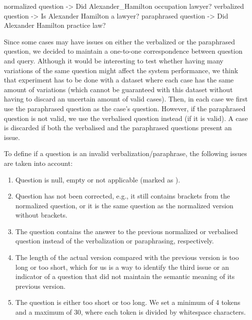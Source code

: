 \begin{sparqlcode}[%
    caption={Example of questions contained in one case of the \LCQuADtwo{} dataset.}, 
    label={lst:questionExampleLcquad2}]
normalized question  -> Did {Alexander_Hamilton} {occupation} {lawyer}?
verbalized question  -> Is Alexander Hamilton a lawyer?
paraphrased question -> Did Alexander Hamilton practice law?
\end{sparqlcode}

Since some cases may have issues on either the verbalized or the paraphrased question, we 
decided to maintain a one-to-one correspondence between question and query. Although it would 
be interesting to test whether having many variations of the same question might affect the 
system performance, we think that experiment has to be done with a dataset where each case has 
the same amount of variations (which cannot be guaranteed with this dataset without having to 
discard an uncertain amount of valid cases). Then, in each case we first use the paraphrased 
question as the case’s question. However, if the paraphrased question is not valid, we use the 
verbalised question instead (if it is valid). A case is discarded if both the verbalised and 
the paraphrased questions present an issue.

To define if a question is an invalid verbalization/paraphrase, the following issues are taken 
into account:

\begin{enumerate}
    \item Question is null, empty or not applicable (marked as ). 
    \item Question has not been corrected, e.g., it still contains brackets from the normalized 
    question, or it is the same question as the normalized version without brackets.
    \item The question contains the answer to the previous normalized or verbalised question 
    instead of the verbalization or paraphrasing, respectively. 
    \item The length of the actual version compared with the previous version is too long or too 
    short, which for us is a way to identify the third issue or an indicator of a question that 
    did not maintain the semantic meaning of its previous version.
    \item The question is either too short or too long. We set a minimum of 4 tokens and a 
    maximum of 30, where each token is divided by whitespace characters.
\end{enumerate}

